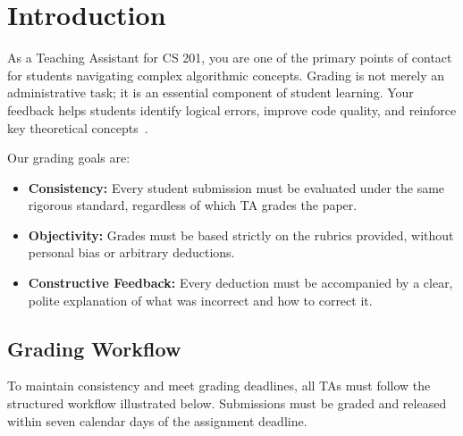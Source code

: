 \section{Introduction}
As a Teaching Assistant for CS 201, you are one of the primary points of contact for students navigating complex algorithmic concepts. Grading is not merely an administrative task; it is an essential component of student learning. Your feedback helps students identify logical errors, improve code quality, and reinforce key theoretical concepts~\cite{barker2018effective}.

Our grading goals are:
\begin{itemize}
    \item \textbf{Consistency:} Every student submission must be evaluated under the same rigorous standard, regardless of which TA grades the paper.
    \item \textbf{Objectivity:} Grades must be based strictly on the rubrics provided, without personal bias or arbitrary deductions.
    \item \textbf{Constructive Feedback:} Every deduction must be accompanied by a clear, polite explanation of what was incorrect and how to correct it.
\end{itemize}

\subsection{Grading Workflow}
To maintain consistency and meet grading deadlines, all TAs must follow the structured workflow illustrated below. Submissions must be graded and released within seven calendar days of the assignment deadline.

